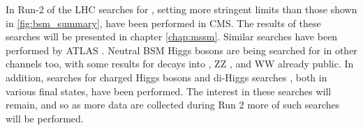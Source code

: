 In Run-2 of the \ac{LHC} searches for \AHtotautau, setting more stringent limits than those shown in \ref{fig:bsm_summary},
have been performed in \ac{CMS}. The results of these searches will be presented in chapter \ref{chap:mssm}. 
Similar searches have been performed by \acs{ATLAS} \cite{ATLASMSSMtautau2016}. Neutral BSM Higgs bosons
are being searched for in other channels too, with some results for decays into \ttbar \cite{ATLASHttbar}, 
ZZ \cite{CMSHZZ2016,ATLASHZZ2016}, and WW \cite{ATLASHeavyHWW} already public.
In addition, searches for charged
Higgs bosons \cite{ATLASHplustaunu,ATLASHplustb,CMSHplustaunu} and
di-Higgs searches \cite{ATLASHbbgamgam,ATLASHgamgamWW,ATLASHhhbbbb,CMSbbgamgam,CMSHbbtautau,CMSHbbWW}, both in 
various final states, have been performed. The interest in these searches will remain, and so
as more data are collected during Run 2 more of such searches will be performed.

